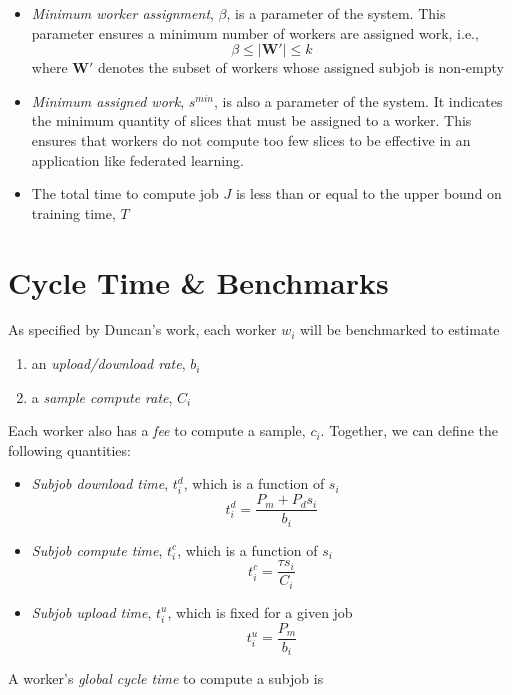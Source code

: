 \documentclass[
    draft,
    final,
]{article}
\begin{document}
    \begin{itemize}
        \item \textit{Minimum worker assignment}, $\beta$, is a parameter of the system. This parameter ensures a minimum number of workers are assigned work, i.e.,
            \[\beta \leq \vert \mathbf{W'} \vert \leq k\]
            where $\mathbf{W'}$ denotes the subset of workers whose assigned subjob is non-empty
        \item \textit{Minimum assigned work}, $s^{min}$, is also a parameter of the system. It indicates the minimum quantity of slices that must be assigned to a worker. This ensures that workers do not compute too few slices to be effective in an application like federated learning.
        \item The total time to compute job $J$ is less than or equal to the upper bound on training time, $T$
    \end{itemize}
    
    \section{Cycle Time \& Benchmarks}
    
    As specified by Duncan's work, each worker $w_i$ will be benchmarked to estimate
    
    \begin{enumerate}
        \item an \textit{upload/download rate}, $b_i$
        \item a \textit{sample compute rate}, $C_i$
    \end{enumerate}
    
    Each worker also has a \textit{fee} to compute a sample, $c_i$. Together, we can define the following quantities:
    
    \begin{itemize}
        \item \textit{Subjob download time}, $t^d_i$, which is a function of $s_i$
            \[t^d_i = \frac{P_m + P_d s_i}{b_i}\]
        \item \textit{Subjob compute time}, $t^c_i$, which is a function of $s_i$
            \[t^c_i = \frac{\tau s_i}{C_i}\]
        \item \textit{Subjob upload time}, $t^u_i$, which is fixed for a given job
            \[t^u_i = \frac{P_m}{b_i}\]
    \end{itemize}
    
    A worker's \textit{global cycle time} to compute a subjob is
    
\end{document}

